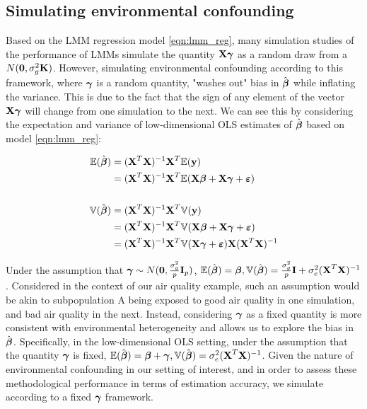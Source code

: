 \subsection{Simulating environmental confounding}
Based on the LMM regression model \ref{eqn:lmm_reg}, many simulation studies of the performance of LMMs \cite{Rakitsch2012, bhatnagar2019simultaneous}  simulate the quantity $\textbf{X}\boldsymbol{\gamma}$ as a random draw from a $N(\boldsymbol{0}, \sigma^2_g \textbf{K})$. However, simulating environmental confounding according to this framework, where $\boldsymbol{\gamma}$ is a random quantity, "washes out" bias in $\hat{\boldsymbol{\beta}}$ while inflating the variance. This is due to the fact that the sign of any element of the vector $\textbf{X}\boldsymbol{\gamma}$ will change from one simulation to the next. We can see this by considering the expectation and variance of low-dimensional OLS estimates of $\hat{\boldsymbol{\beta}}$ based on model \ref{eqn:lmm_reg}:

\begin{align*}
    \mathbb{E}(\hat{\boldsymbol{\beta}}) &= (\textbf{X}^T \textbf{X})^{-1} \textbf{X}^T \mathbb{E}(\textbf{y})\\
    &=  (\textbf{X}^T \textbf{X})^{-1} \textbf{X}^T \mathbb{E}(\textbf{X}\boldsymbol{\beta} + \textbf{X}\boldsymbol{\gamma} + \boldsymbol{\varepsilon})\\
    &\quad\\
    \mathbb{V}(\hat{\boldsymbol{\beta}}) &= (\textbf{X}^T \textbf{X})^{-1} \textbf{X}^T \mathbb{V}(\textbf{y})\\
    &=  (\textbf{X}^T \textbf{X})^{-1} \textbf{X}^T \mathbb{V}(\textbf{X}\boldsymbol{\beta} + \textbf{X}\boldsymbol{\gamma} + \boldsymbol{\varepsilon})\\
    &=  (\textbf{X}^T \textbf{X})^{-1} \textbf{X}^T \mathbb{V}(\textbf{X}\boldsymbol{\gamma} + \boldsymbol{\varepsilon}) \textbf{X}  (\textbf{X}^T \textbf{X})^{-1}
\end{align*}

Under the assumption that $\boldsymbol{\gamma} \sim N(\boldsymbol{0}, \frac{\sigma^2_g}{p} \textbf{I}_p)$, $\mathbb{E}(\hat{\boldsymbol{\beta}}) = \boldsymbol{\beta}, \mathbb{V}(\hat{\boldsymbol{\beta}}) = \frac{\sigma^2_g}{p}\textbf{I} + \sigma^2_e (\textbf{X}^T \textbf{X})^{-1}$. Considered in the context of our air quality example, such an assumption would be akin to subpopulation A being exposed to good air quality in one simulation, and bad air quality in the next. Instead, considering $\boldsymbol{\gamma}$ as a fixed quantity is more consistent with environmental heterogeneity and allows us to explore the bias in $\hat{\boldsymbol{\beta}}$. Specifically, in the low-dimensional OLS setting, under the assumption that the quantity $\boldsymbol{\gamma}$ is fixed, $\mathbb{E}(\hat{\boldsymbol{\beta}}) = \boldsymbol{\beta} + \boldsymbol{\gamma}, \mathbb{V}(\hat{\boldsymbol{\beta}}) = \sigma^2_e (\textbf{X}^T \textbf{X})^{-1}$. Given the nature of environmental confounding in our setting of interest, and in order to assess these methodological performance in terms of estimation accuracy, we simulate according to a fixed $\boldsymbol{\gamma}$ framework. 

